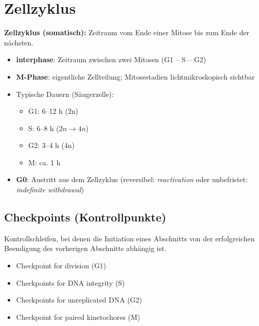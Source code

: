 
\section{Zellzyklus}\label{sec:zellzyklus}

\textbf{Zellzyklus (somatisch):} Zeitraum vom Ende einer Mitose bis zum Ende der nächsten.

\begin{itemize}
    \item \textbf{\gls{interphase}}: Zeitraum zwischen zwei Mitosen (G1 -- S -- G2)
    \item \textbf{M-Phase}: eigentliche Zellteilung; Mitosestadien lichtmikroskopisch sichtbar
    \item Typische Dauern (Säugerzelle):
    \begin{itemize}
        \item G1: 6--12 h (2n)
        \item S: 6--8 h ($2n \rightarrow 4n$)
        \item G2: 3--4 h (4n)
        \item M: ca.
        1 h
    \end{itemize}
    \item \textbf{G0}: Austritt aus dem Zellzyklus (reversibel: \emph{reactivation} oder unbefristet: \emph{indefinite withdrawal})
\end{itemize}


\subsection{Checkpoints (Kontrollpunkte)}\label{subsec:checkpoints-(kontrollpunkte)}

Kontrollschleifen, bei denen die Initiation eines Abschnitts von der erfolgreichen
Beendigung des vorherigen Abschnitts abhängig ist.

\begin{itemize}
    \item Checkpoint for division (G1)
    \item Checkpoints for DNA integrity (S)
    \item Checkpoints for unreplicated DNA (G2)
    \item Checkpoint for paired kinetochores (M)
\end{itemize}

